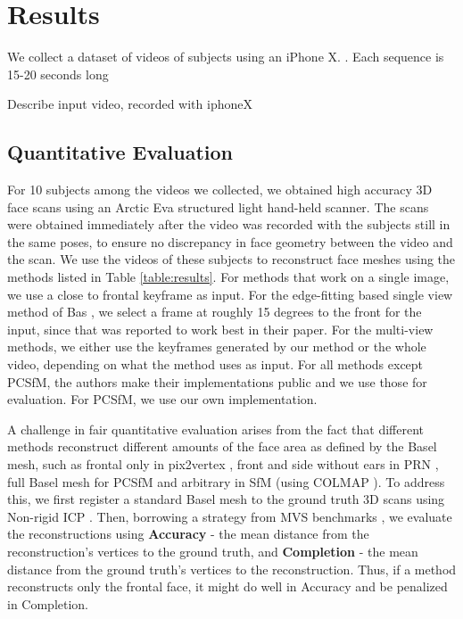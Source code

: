 \documentclass[10pt,twocolumn,letterpaper]{article}
\begin{document}
\section{Results}

We collect a dataset of videos of subjects using an iPhone X. . Each sequence is 15-20 seconds long 

Describe input video, recorded with iphoneX 

\subsection{Quantitative Evaluation} \label{sec:quant}

For 10 subjects among the videos we collected, we obtained high accuracy 3D face scans using an Arctic Eva structured light hand-held scanner. The scans were obtained immediately after the video was recorded with the subjects still in the same poses, to ensure no discrepancy in face geometry between the video and the scan. We use the videos of these subjects to reconstruct face meshes using the methods listed in Table \ref{table:results}. For methods that work on a single image, we use a close to frontal keyframe as input. For the edge-fitting based single view method of Bas \etal \cite{bas2016fitting}, we select a frame at roughly 15 degrees to the front for the input, since that was reported to work best in their paper. For the multi-view methods, we either use the keyframes generated by our method or the whole video, depending on what the method uses as input.
For all methods except PCSfM, the authors make their implementations public and we use those for evaluation. For PCSfM, we use our own implementation.

A challenge in fair quantitative evaluation arises from the fact that different methods reconstruct different amounts of the face area as defined by the Basel mesh, such as frontal only in pix2vertex \cite{sela2017unrestricted} , front and side without ears in PRN \cite{feng2018joint}, full Basel mesh for PCSfM \cite{hernandez2017accurate} and arbitrary in SfM (using COLMAP \cite{schonberger2016structure}). To address this, we first register a standard Basel mesh to the ground truth 3D scans using Non-rigid ICP \cite{amberg2007optimal,booth2018large}. Then, borrowing a strategy from MVS benchmarks \cite{jensen2014large,knapitsch2017tanks,yao2018mvsnet}, we evaluate the reconstructions using \textbf{Accuracy} - the mean distance from the reconstruction's vertices to the ground truth, and \textbf{Completion} - the mean distance from the ground truth's vertices to the reconstruction. Thus, if a method reconstructs only the frontal face, it might do well in Accuracy and be penalized in Completion.
\end{document}
